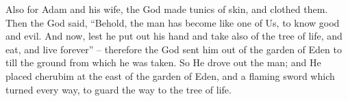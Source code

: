 \bverse Also for Adam and his wife, the \lord God made tunics of skin, and clothed them.
\bverse Then the \lord God said, ``Behold, the man has become like one of Us, to know good and evil. And now, lest he put out his hand and take also of the tree of life, and eat, and live forever'' --
\bverse therefore the \lord God sent him out of the garden of Eden to till the ground from which he was taken.
\bverse So He drove out the man; and He placed cherubim at the east of the garden of Eden, and a flaming sword which turned every way, to guard the way to the tree of life.



